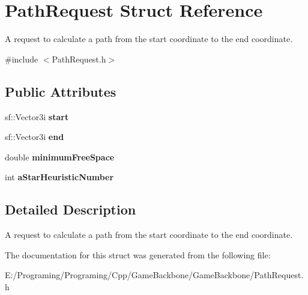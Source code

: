 \hypertarget{struct_path_request}{}\section{Path\+Request Struct Reference}
\label{struct_path_request}


A request to calculate a path from the start coordinate to the end coordinate.  




{\ttfamily \#include $<$Path\+Request.\+h$>$}

\subsection*{Public Attributes}
\begin{DoxyCompactItemize}
\item 
\mbox{\label{struct_path_request_a0da4e5baebc9ba612e414dee107c758d}} 
sf\+::\+Vector3i {\bfseries start}
\item 
\mbox{\label{struct_path_request_a10872c0f81503b1fff75a5c16ab59061}} 
sf\+::\+Vector3i {\bfseries end}
\item 
\mbox{\label{struct_path_request_a7a0ad43322694a181509fa1875669bde}} 
double {\bfseries minimum\+Free\+Space}
\item 
\mbox{\label{struct_path_request_a90d69c7b312d2009b29aee5ad9846274}} 
int {\bfseries a\+Star\+Heuristic\+Number}
\end{DoxyCompactItemize}


\subsection{Detailed Description}
A request to calculate a path from the start coordinate to the end coordinate. 



The documentation for this struct was generated from the following file\+:\begin{DoxyCompactItemize}
\item 
E\+:/\+Programing/\+Programing/\+Cpp/\+Game\+Backbone/\+Game\+Backbone/Path\+Request.\+h\end{DoxyCompactItemize}
